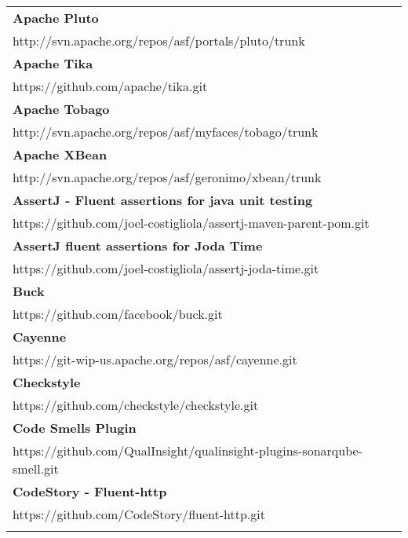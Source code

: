 \begin{table}[]
\small
\begin{tabular}{|p{130mm}|}
	
\hline
\bf Apache Pluto                                       \\ http://svn.apache.org/repos/asf/portals/pluto/trunk                      \\ \hline \bf
Apache Tika                                        \\ https://github.com/apache/tika.git                                           \\ \hline \bf
Apache Tobago                                      \\ http://svn.apache.org/repos/asf/myfaces/tobago/trunk                         \\ \hline \bf
Apache XBean                                       \\ http://svn.apache.org/repos/asf/geronimo/xbean/trunk                         \\ \hline \bf
AssertJ - Fluent assertions for java unit testing  \\ https://github.com/joel-costigliola/assertj-maven-parent-pom.git             \\ \hline \bf 
AssertJ fluent assertions for Joda Time            \\ https://github.com/joel-costigliola/assertj-joda-time.git                    \\ \hline \bf
Buck                                               \\ https://github.com/facebook/buck.git                                         \\ \hline \bf
Cayenne                                            \\ https://git-wip-us.apache.org/repos/asf/cayenne.git                          \\ \hline \bf
Checkstyle                                         \\ https://github.com/checkstyle/checkstyle.git                                 \\ \hline \bf
Code Smells Plugin                                 \\ https://github.com/QualInsight/qualinsight-plugins-sonarqube-smell.git       \\ \hline \bf
CodeStory - Fluent-http                            \\ https://github.com/CodeStory/fluent-http.git                                 \\ \hline \bf

\end{tabular}
\end{table}
